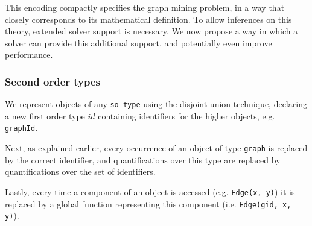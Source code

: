 This encoding compactly specifies the graph mining problem, in a way that closely corresponds to its mathematical definition.
To allow inferences on this theory, extended solver support is necessary.
We now propose a way in which a solver can provide this additional support, and potentially even improve performance.

\subsubsection{Second order types}
We represent objects of any \lstinline|so-type| using the disjoint union technique, declaring a new first order type $id$ containing identifiers for the higher objects, e.g. \lstinline|graphId|.

Next, as explained earlier, every occurrence of an object of type \lstinline|graph| is replaced by the correct identifier, and quantifications over this type are replaced by quantifications over the set of identifiers.

Lastly, every time a component of an object is accessed (e.g. \lstinline|Edge(x, y)|) it is replaced by a global function representing this component (i.e. \lstinline|Edge(gid, x, y)|).


